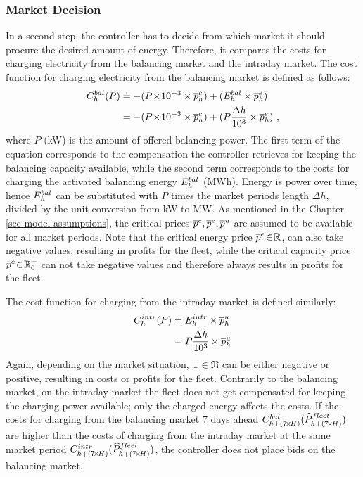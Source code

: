 \documentclass[a4paper, 12pt]{article}
\begin{document}
\subsubsection{Market Decision}
\label{sec:orge75392b}
In a second step, the controller has to decide from which market it should
procure the desired amount of energy. Therefore, it compares the costs for
charging electricity from the balancing market and the intraday market. The cost
function for charging electricity from the balancing market is defined as follows:
\begin{equation} \label{eq-cost-balancing}
\begin{split}
    C^{bal}_{h}(P) &\doteq -(P\!\times\!10^{-3} \times \overline p^c_{h}) + (E^{bal}_{h} \times \overline p^e_{h}) \\
    &= -(P\!\times\!10^{-3} \times \overline p^c_{h}) + (P \frac{\Delta h}{10^{3}} \times \overline p^e_{h}) \text{ ,}
\end{split}
\end{equation}
where \(P\) (kW) is the amount of offered balancing power. The first term of the
equation corresponds to the compensation the controller retrieves for keeping
the balancing capacity available, while the second term corresponds to the costs
for charging the activated balancing energy \(E^{bal}_{h}\) (MWh). Energy is power over
time, hence \(E^{bal}_{h}\) can be substituted with \(P\) times the market periods length
\(\Delta{h}\), divided by the unit conversion from kW to MW. As mentioned in the
Chapter \ref{sec-model-assumptions}, the critical prices \(\overline p^c_{}, \overline p^e_{}, \overline p^u_{}\)
are assumed to be available for all market periods. Note that the critical
energy price \(\overline p^e_{}\!\in\!\mathbb{R}\), can also take negative values, resulting in
profits for the fleet, while the critical capacity price \(\overline p^c_{}\!\in\! \mathbb{R}^+_0\)
can not take negative values and therefore always results in profits for the
fleet.

The cost function for charging from the intraday market is defined similarly:
\begin{equation}
\begin{split}
    C^{intr}_{h}(P) &\doteq E^{intr}_{h} \times \overline p^u_{h} \\
    &= P \frac{\Delta h}{10^{3}}\times \overline p^u_{h}
\end{split}
\end{equation}
Again, depending on the market situation, \(\cup{}\!\in\!\Re\) can be either
negative or positive, resulting in costs or profits for the fleet. Contrarily to
the balancing market, on the intraday market the fleet does not get compensated
for keeping the charging power available; only the charged energy affects the
costs. If the costs for charging from the balancing market 7 days ahead
\(C^{bal}_{h+(7\!\times\!H)}(\widehat{P}^{fleet}_{h+(7\!\times\!H)})\) are higher than the costs of
charging from the intraday market at the same market period \(C^{intr}_{h +
(7\!\times\!H)}(\widehat{P}^{fleet}_{h+(7\!\times\!H)})\), the controller does not place bids
on the balancing market.
\end{document}
